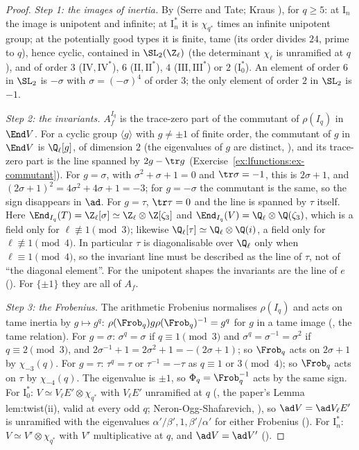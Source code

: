 \begin{proof}
\emph{Step 1: the images of inertia.} By  (Serre and Tate; Kraus \cite{Kraus90}), for $q\ge5$: at $\mathrm I_n$ the image is unipotent and infinite; at $\mathrm I_n^*$ it is
$\chi_{q^*}$ times an infinite unipotent group; at the potentially good types it is finite, tame (its order divides $24$, prime to $q$), hence cyclic, contained in $\SL_2(\Z_\ell)$
(the determinant $\chi_\ell$ is unramified at $q$), and of order $3$ ($\mathrm{IV},\mathrm{IV}^*$), $6$ ($\mathrm{II},\mathrm{II}^*$), $4$ ($\mathrm{III},\mathrm{III}^*$) or $2$ ($\mathrm I_0^*$). An element of order
$6$ in $\SL_2$ is $-\sigma$ with $\sigma=(-\sigma)^4$ of order $3$; the only element of order $2$ in $\SL_2$ is $-1$.

\emph{Step 2: the invariants.} $A_f^{I_q}$ is the trace-zero part of the commutant of $\rho(I_q)$ in $\End V$. For a cyclic group $\langle g\rangle$ with $g\ne\pm1$ of finite order, the
commutant of $g$ in $\End V$ is $\Q_\ell[g]$, of dimension $2$ (the eigenvalues of $g$ are distinct, ), and its trace-zero part is the line spanned by
$2g-\tr g$ (Exercise~\ref{ex:lfunctions:ex-commutant}). For $g=\sigma$, with $\sigma^2+\sigma+1=0$ and $\tr\sigma=-1$, this is $2\sigma+1$, and $(2\sigma+1)^2=4\sigma^2+4\sigma+1=-3$; for $g=-\sigma$
the commutant is the same, so the sign disappears in $\ad$. For $g=\tau$, $\tr\tau=0$ and the line is spanned by $\tau$ itself. Here
$\End_{I_q}(T)=\Z_\ell[\sigma]\simeq\Z_\ell\otimes\Z[\zeta_3]$ and $\End_{I_q}(V)=\Q_\ell\otimes\Q(\zeta_3)$, which is a field only for $\ell\not\equiv1\pmod3$; likewise
$\Q_\ell[\tau]\simeq\Q_\ell\otimes\Q(i)$, a field only for $\ell\not\equiv1\pmod4$. In particular $\tau$ is diagonalisable over $\Q_\ell$ only when $\ell\equiv1\pmod4$, so the
invariant line must be described as the line of $\tau$, not of ``the diagonal element''. For the unipotent shapes the invariants are the line of $e$
(). For $\{\pm1\}$ they are all of $A_f$.

\emph{Step 3: the Frobenius.} The arithmetic Frobenius normalises $\rho(I_q)$ and acts on tame inertia by $g\mapsto g^q$: $\rho(\Frob_q)g\rho(\Frob_q)^{-1}=g^q$ for $g$ in a tame image
(, the tame relation). For $g=\sigma$: $\sigma^q=\sigma$ if $q\equiv1\pmod3$ and $\sigma^q=\sigma^{-1}=\sigma^2$ if $q\equiv2\pmod3$, and $2\sigma^{-1}+1=2\sigma^2+1=-(2\sigma+1)$; so $\Frob_q$
acts on $2\sigma+1$ by $\chi_{-3}(q)$. For $g=\tau$: $\tau^q=\tau$ or $\tau^{-1}=-\tau$ as $q\equiv1$ or $3\pmod4$; so $\Frob_q$ acts on $\tau$ by $\chi_{-4}(q)$. The eigenvalue is $\pm1$, so
$\Phi_q=\Frob_q^{-1}$ acts by the same sign. For $\mathrm I_0^*$: $V\simeq V_\ell E'\otimes\chi_{q^*}$ with $V_\ell E'$ unramified at $q$ (, the paper's Lemma lem:twist(ii),
valid at every odd $q$; Neron-Ogg-Shafarevich, ), so $\ad V=\ad V_\ell E'$ is unramified with the eigenvalues $\alpha'/\beta',1,\beta'/\alpha'$ for either Frobenius
(). For $\mathrm I_n^*$: $V\simeq V'\otimes\chi_{q^*}$ with $V'$ multiplicative at $q$, and $\ad V=\ad V'$ ().


\end{proof}
